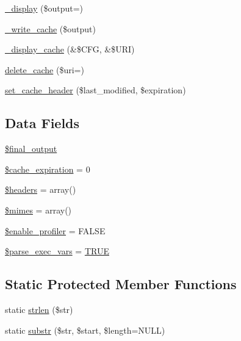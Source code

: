 \begin{DoxyCompactItemize}
\item 
\mbox{\hyperlink{class_c_i___output_acc6949872b39347a6314db4bc8c45c50}{\+\_\+display}} (\$output=\textquotesingle{}\textquotesingle{})
\item 
\mbox{\hyperlink{class_c_i___output_a772aa9eb3f60f66fa194443ca0bdd8a4}{\+\_\+write\+\_\+cache}} (\$output)
\item 
\mbox{\hyperlink{class_c_i___output_acce78bdac02df9ab196a9c5939f6c4ab}{\+\_\+display\+\_\+cache}} (\&\$C\+FG, \&\$U\+RI)
\item 
\mbox{\hyperlink{class_c_i___output_a475c83a7e4d2f7162032c01279c161b4}{delete\+\_\+cache}} (\$uri=\textquotesingle{}\textquotesingle{})
\item 
\mbox{\hyperlink{class_c_i___output_acd24befdfc26233abfbdc62071dcd58b}{set\+\_\+cache\+\_\+header}} (\$last\+\_\+modified, \$expiration)
\end{DoxyCompactItemize}
\subsection*{Data Fields}
\begin{DoxyCompactItemize}
\item 
\mbox{\hyperlink{class_c_i___output_aa1b5049c03b9ef373af010aa3cda17a3}{\$final\+\_\+output}}
\item 
\mbox{\hyperlink{class_c_i___output_a4a65b5005fdb96d5bdac5d642a022f16}{\$cache\+\_\+expiration}} = 0
\item 
\mbox{\hyperlink{class_c_i___output_a52500036ee807241b8b4b7e2367c49ef}{\$headers}} = array()
\item 
\mbox{\hyperlink{class_c_i___output_a2ce7d338d1fd0f0d971ba6213ac298a2}{\$mimes}} = array()
\item 
\mbox{\hyperlink{class_c_i___output_a85f3ab9485440090efd4e0ae9a070747}{\$enable\+\_\+profiler}} = F\+A\+L\+SE
\item 
\mbox{\hyperlink{class_c_i___output_a254d73d122352494697cdba0c509086d}{\$parse\+\_\+exec\+\_\+vars}} = \mbox{\hyperlink{constants_8php_ae04a3efe6aa42044f803ee90c2277846}{T\+R\+UE}}
\end{DoxyCompactItemize}
\subsection*{Static Protected Member Functions}
\begin{DoxyCompactItemize}
\item 
static \mbox{\hyperlink{class_c_i___output_a4c29a687d4ed62c26a10e41d98930d5f}{strlen}} (\$str)
\item 
static \mbox{\hyperlink{class_c_i___output_a101caef57ef0b165da5747e2c2e6c9dc}{substr}} (\$str, \$start, \$length=N\+U\+LL)
\end{DoxyCompactItemize}
